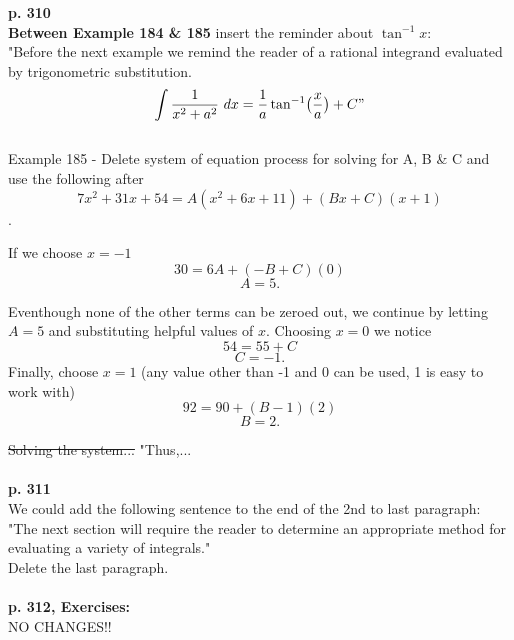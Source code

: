 \documentclass[11pt]{report}
\begin{document}
\textbf{p. 310}\\
\textbf{Between Example 184 \& 185} insert the reminder about $\tan^{-1} x$:\\
"Before the next example we remind the reader of a rational integrand evaluated by trigonometric substitution.
$$\int \frac{1}{x^2+a^2}~dx = \frac{1}{a} \tan^{-1} \bigl(\frac{x}{a}\bigr) + C"$$
\\

Example 185 - Delete system of equation process for solving for A, B \& C and use the following after $$7x^2+31x+54 =A(x^2+6x+11) + (Bx+C)(x+1)$$.

If we choose $x=-1$
$$30 =6A + (-B+C)(0)$$
$$A= 5.$$ 

Eventhough none of the other terms can be zeroed out, we continue by letting $A=5$ and substituting helpful values of $x$. 
Choosing  $x=0$ we notice
$$54 = 55 +C$$
$$C= -1.$$ 
Finally, choose $x=1$ (any value other than -1 and 0 can be used, 1 is easy to work with)
$$92 =90 + (B-1)(2)$$
$$B= 2.$$ 

\sout{Solving the system... }"Thus,...\\ \\


\textbf{p. 311}\\

We could add the following sentence to the end of the 2nd to last paragraph: "The next section will require the reader to determine an appropriate method for evaluating a variety of integrals."\\
Delete the last paragraph.\\ \\


\textbf{p. 312, Exercises:}\\

NO CHANGES!!
\end{document}
